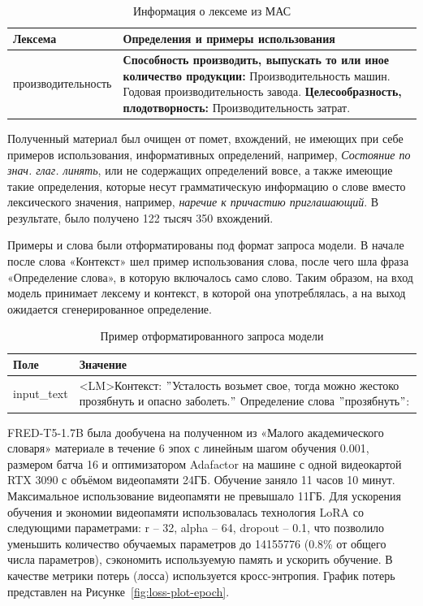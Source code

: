 \documentclass[LI,VKR]{HSEUniversity}
\begin{document}
\begin{table}[H]
\centering
\caption{Информация о лексеме из МАС} \\
\label{tab:Пример МАС}
\begin{tabular}{|m{4.5cm}|m{9.5cm}|}
\hline
\textbf{Лексема} & \textbf{Определения и примеры использования} \\
\hline
производительность & \textbf{Способность производить, выпускать то или иное количество продукции:} Производительность машин. Годовая производительность завода.
\newline \textbf{Целесообразность, плодотворность:} Производительность затрат. \\
\hline
\end{tabular}
\end{table}

Полученный материал был очищен от помет, вхождений, не имеющих при себе примеров использования,
информативных определений, например, \textit{Состояние по знач. глаг. линять},
или не содержащих определений вовсе, а также имеющие такие определения,
которые несут грамматическую информацию о слове вместо лексического значения,
например, \textit{наречие к причастию приглашающий}.
В результате, было получено 122 тысяч 350 вхождений.

Примеры и слова были отформатированы под формат запроса модели.
В начале после слова «Контекст» шел пример использования слова, после чего шла фраза
«Определение слова», в которую включалось само слово.
Таким образом, на вход модель
принимает лексему и контекст, в которой она употреблялась, а на выход ожидается сгенерированное
определение.

\begin{table}[H]
\centering
\caption{Пример отформатированного запроса модели}
\begin{tabular}{|m{2.5cm}|m{9.5cm}|}
\hline
\textbf{Поле}       & \textbf{Значение}                                                                                          \\
\hline
input\_text  & <LM>Контекст: \("\)Усталость возьмет свое, тогда можно жестоко прозябнуть и опасно заболеть.\("\) Определение слова \("\)прозябнуть\("\): \\
\hline
\end{tabular}
\end{table}

FRED-T5-1.7B была дообучена на полученном из «Малого академического словаря» материале
в течение 6 эпох с линейным шагом обучения 0.001,
размером батча 16 и оптимизатором Adafactor на машине с одной видеокартой RTX 3090
с объёмом видеопамяти 24ГБ.
Обучение заняло 11 часов 10 минут. %
Максимальное использование видеопамяти не превышало 11ГБ. %
Для ускорения обучения и экономии видеопамяти использовалась технология LoRA со
следующими параметрами: r – 32, alpha
 – 64, dropout – 0.1, что позволило
уменьшить количество обучаемых параметров до 14155776 (0.8\% от общего числа параметров),
сэкономить используемую память и ускорить обучение.
В качестве метрики потерь (лосса) используется кросс-энтропия.
График потерь представлен на Рисунке~\ref{fig:loss-plot-epoch}.
\end{document}
